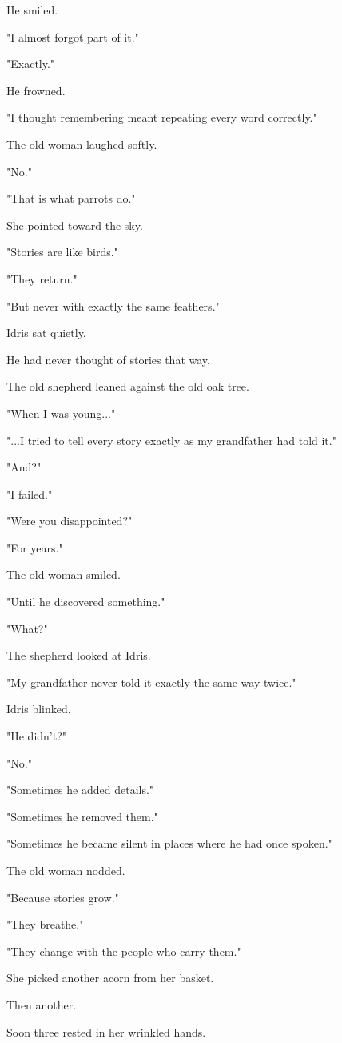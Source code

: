 \documentclass[12pt,openany]{book}
\begin{document}
He smiled.

"I almost forgot part of it."

"Exactly."

He frowned.

"I thought remembering meant repeating every word correctly."

The old woman laughed softly.

"No."

"That is what parrots do."

She pointed toward the sky.

"Stories are like birds."

"They return."

"But never with exactly the same feathers."

Idris sat quietly.

He had never thought of stories that way.

The old shepherd leaned against the old oak tree.

"When I was young..."

"...I tried to tell every story exactly as my grandfather had told it."

"And?"

"I failed."

"Were you disappointed?"

"For years."

The old woman smiled.

"Until he discovered something."

"What?"

The shepherd looked at Idris.

"My grandfather never told it exactly the same way twice."

Idris blinked.

"He didn't?"

"No."

"Sometimes he added details."

"Sometimes he removed them."

"Sometimes he became silent in places where he had once spoken."

The old woman nodded.

"Because stories grow."

"They breathe."

"They change with the people who carry them."

She picked another acorn from her basket.

Then another.

Soon three rested in her wrinkled hands.
\end{document}
